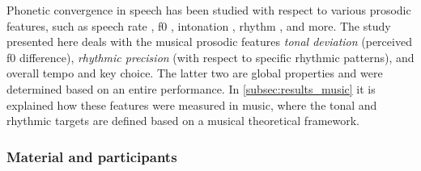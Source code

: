 Phonetic convergence in speech has been studied with respect to various prosodic features, such as speech rate \citep{Schweitzer2013convergence, Pardo2012phonetic}, \ac{f0} \citep{Babel2012role, Collins1998convergence}, intonation \citep{DImperio2014phonetic, Simonet2011intonational}, rhythm \citep{Krivokapic2013rhythm}, and more.
The study presented here deals with the musical prosodic features \emph{tonal deviation} (perceived \ac{f0} difference), \emph{rhythmic precision} (with respect to specific rhythmic patterns), and overall tempo and key choice.
The latter two are global properties and were determined based on an entire performance.
In \cref{subsec:results_music} it is explained how these features were measured in music, where the tonal and rhythmic targets are defined based on a musical theoretical framework.

\subsubsection{Material and participants}
\label{subsubsec:material_participants_music}

